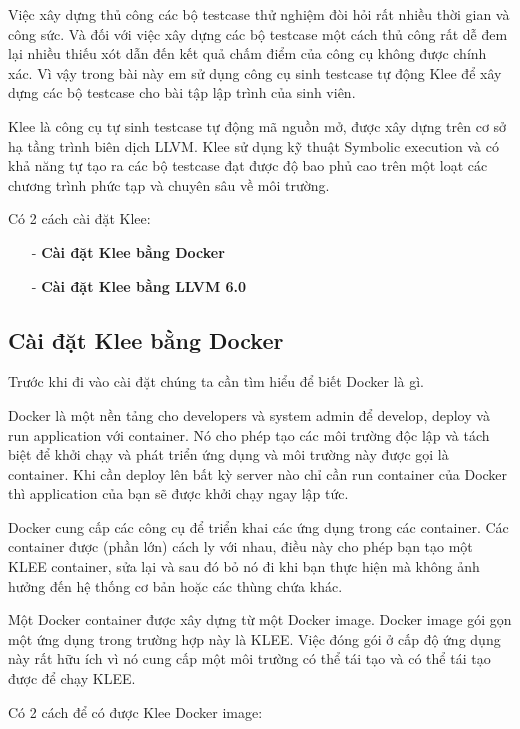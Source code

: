 \documentclass[12pt,a4paper]{report}
\begin{document}
Việc xây dựng thủ công các bộ testcase thử nghiệm đòi hỏi rất nhiều thời gian và công sức. Và đối với việc xây dựng các bộ testcase một cách thủ công rất dễ đem lại nhiều thiếu xót dẫn đến kết quả chấm điểm của công cụ không được chính xác. Vì vậy trong bài này em sử dụng công cụ sinh testcase tự động Klee để xây dựng các bộ testcase cho bài tập lập trình của sinh viên.

Klee là công cụ tự sinh testcase tự động mã nguồn mở, được xây dựng trên cơ sở hạ tầng trình biên dịch LLVM. Klee sử dụng kỹ thuật Symbolic execution và có khả năng tự tạo ra các bộ testcase đạt được độ bao phủ cao trên một loạt các chương trình phức tạp và chuyên sâu về môi trường.

Có 2 cách cài đặt Klee:
\begin{itemize}
\item[-] \textbf{Cài đặt Klee bằng Docker}
\item[-] \textbf{Cài đặt Klee bằng LLVM 6.0}
\end{itemize}

\subsection{Cài đặt Klee bằng Docker}
Trước khi đi vào cài đặt chúng ta cần tìm hiểu để biết Docker là gì.

Docker là một nền tảng cho developers và system admin để develop, deploy và run application với container. Nó cho phép tạo các môi trường độc lập và tách biệt để khởi chạy và phát triển ứng dụng và môi trường này được gọi là container. Khi cần deploy lên bất kỳ server nào chỉ cần run container của Docker thì application của bạn sẽ được khởi chạy ngay lập tức.

Docker cung cấp các công cụ để triển khai các ứng dụng trong các container. Các container được (phần lớn) cách ly với nhau, điều này cho phép bạn tạo một KLEE container, sửa lại và sau đó bỏ nó đi khi bạn thực hiện mà không ảnh hưởng đến hệ thống cơ bản hoặc các thùng chứa khác.

Một Docker container được xây dựng từ một Docker image. Docker image gói gọn một ứng dụng trong trường hợp này là KLEE. Việc đóng gói ở cấp độ ứng dụng này rất hữu ích vì nó cung cấp một môi trường có thể tái tạo và có thể tái tạo được để chạy KLEE.

Có 2 cách để có được Klee Docker image:
\end{document}
